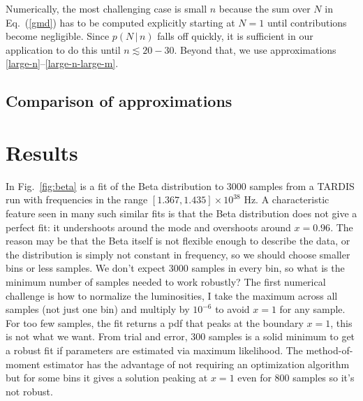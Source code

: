\documentclass[11pt]{article}
\newcommand{\cond}{\,|\,}
\newcommand{\refeq}[1]{Eq.~(\ref{#1})}
\newcommand{\reffig}[1]{Fig.~\ref{fig:#1}}
\begin{document}
Numerically, the most challenging case is small $n$ because the sum
over $N$ in \refeq{gmd} has to be computed explicitly starting at
$N=1$ until contributions become negligible. Since $p(N \cond n)$
falls off quickly, it is sufficient in our application to do this
until $n \lesssim 20-30$. Beyond that, we use approximations
\ref{large-n}--\ref{large-n-large-m}.

\subsection*{Comparison of approximations}

\section{Results}

In \reffig{beta} is a fit of the Beta distribution to 3000
samples from a TARDIS run with frequencies in the range $[1.367,
1.435] \times 10^{38}$ Hz. A characteristic feature seen in many such
similar fits is that the Beta distribution does not give a perfect
fit: it undershoots around the mode and overshoots around
$x=0.96$. The reason may be that the Beta itself is not flexible
enough to describe the data, or the distribution is simply not
constant in frequency, so we should choose smaller bins or less
samples. We don't expect 3000 samples in every bin, so what is the
minimum number of samples needed to work robustly? The first numerical
challenge is how to normalize the luminosities, I take the maximum
across all samples (not just one bin) and multiply by $10^{-6}$ to
avoid $x=1$ for any sample. For too few samples, the fit returns a pdf
that peaks at the boundary $x=1$, this is not what we want. From trial
and error, 300 samples is a solid minimum to get a robust fit if
parameters are estimated via maximum likelihood. The method-of-moment
estimator has the advantage of not requiring an optimization algorithm
but for some bins it gives a solution peaking at $x=1$ even for 800
samples so it's not robust.
\end{document}
